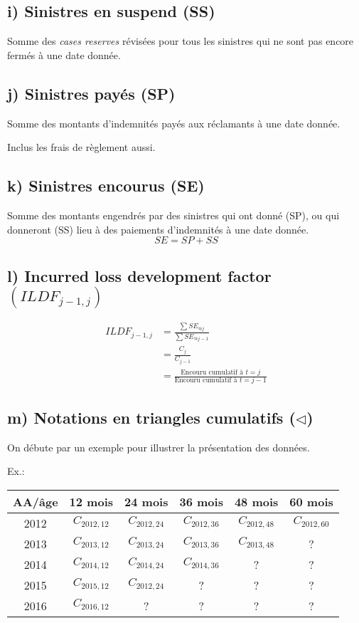 \documentclass[11pt,french]{report}
\begin{document}
\subsection*{i) Sinistres en suspend (SS)}
Somme des \emph{cases reserves} révisées pour tous les sinistres qui ne sont pas encore fermés à une date donnée.

\subsection*{j) Sinistres payés (SP)}
Somme des montants d'indemnités payés aux réclamants à une date donnée.

Inclus les frais de règlement aussi.

\subsection*{k) Sinistres encourus (SE)}
Somme des montants engendrés par des sinistres qui ont donné (SP), ou qui donneront (SS) lieu à des paiements d'indemnités à une date donnée.
$$ SE = SP + SS $$

\subsection*{l) Incurred loss development factor $(ILDF_{j-1, j})$}

\begin{align*}
ILDF_{j-1, j} &= \frac{\sum SE_{@j}}{\sum SE_{@j-1}} \\
&= \frac{C_j}{C_{j-1}} \\
&= \frac{\text{Encouru cumulatif à $t = j$}}{\text{Encouru cumulatif à $t = j-1$}}
\end{align*}

\subsection*{m) Notations en triangles cumulatifs ($\triangleleft$)}
On débute par un exemple pour illustrer la présentation des données.

Ex.:\\

\begin{center}
\begin{tabular}{|c|c|c|c|c|c|}
  \hline
   AA/âge & 12 mois & 24 mois & 36 mois & 48 mois & 60 mois \\
  \hline
  2012 & $C_{2012, 12}$ & $C_{2012, 24}$ & $C_{2012, 36}$ & $C_{2012, 48}$ & $C_{2012, 60}$\\
  2013 & $C_{2013, 12}$ & $C_{2013, 24}$ & $C_{2013, 36}$ & $C_{2013, 48}$ & ?\\
  2014 & $C_{2014, 12}$ & $C_{2014, 24}$ & $C_{2014, 36}$ & ? & ?\\ 
  2015 & $C_{2015, 12}$ & $C_{2012, 24}$ & ? & ? & ? \\
  2016 & $C_{2016, 12}$ & ? & ? & ? & ?\\ 
  \hline
\end{tabular}
\end{center}
\end{document}
